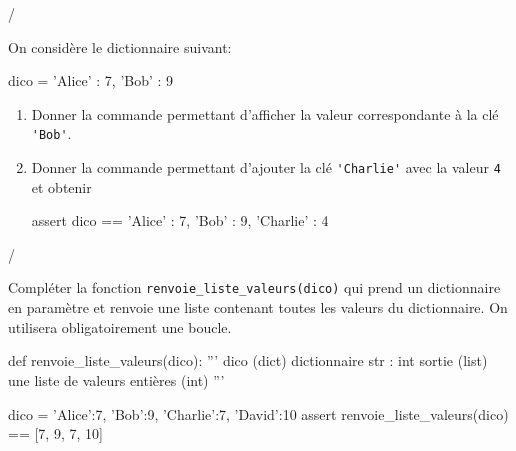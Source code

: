 \documentclass[a4paper]{article}
\begin{document}
\begin{exerciceinterro}{\hspace{2cm}\dotfill/}{}

On considère le dictionnaire suivant:

\begin{CodePythontexAlt}[Largeur=17cm,
TaillePolice = \normalsize, 
EspacementVertical = 1.2,
Lignes=false]{}
dico = {'Alice' : 7, 'Bob' : 9}
\end{CodePythontexAlt}


\begin{enumerate}
\item Donner la commande permettant d'afficher la valeur correspondante à la clé \verb+'Bob'+.

	\zonereponse{1cm}

\item Donner la commande permettant d'ajouter la clé \verb+'Charlie'+ avec la valeur \verb+4+ et obtenir 

\begin{CodePythontexAlt}[Largeur=17cm,
TaillePolice = \normalsize, 
EspacementVertical = 1.2,
Lignes=false]{}
assert dico == {'Alice' : 7, 'Bob' : 9, 'Charlie' : 4}
\end{CodePythontexAlt}

	\zonereponse{1cm}

\end{enumerate}
\end{exerciceinterro}

\newpage
\pagestyle{DS_LP}

\begin{exerciceinterro}{\hspace{2cm}\dotfill/}{}


 Compléter la fonction \verb+renvoie_liste_valeurs(dico)+ qui prend un dictionnaire en paramètre et renvoie une liste contenant toutes les valeurs du dictionnaire. On utilisera obligatoirement une boucle.


\begin{CodePythontexAlt}[Largeur=17cm,
TaillePolice = \normalsize, 
EspacementVertical = 1.2,
Lignes=false]{}
def renvoie_liste_valeurs(dico):
	''' dico (dict)  dictionnaire {str : int}
	sortie (list) une liste de valeurs entières (int) '''
	
	
	
	
		
		
			

dico = {'Alice':7, 'Bob':9, 'Charlie':7, 'David':10}	
assert renvoie_liste_valeurs(dico) == [7, 9, 7, 10]
	
\end{CodePythontexAlt}

\end{exerciceinterro}
\end{document}
